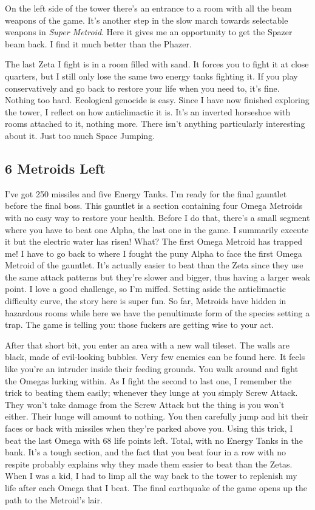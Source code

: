 \documentclass{book}
\begin{document}
On the left side of the tower there’s an entrance to a room with all the beam weapons of the game. It’s another step in the slow march towards selectable weapons in \emph{Super Metroid}. Here it gives me an opportunity to get the Spazer beam back. I find it much better than the Phazer.

The last Zeta I fight is in a room filled with sand. It forces you to fight it at close quarters, but I still only lose the same two energy tanks fighting it. If you play conservatively and go back to restore your life when you need to, it’s fine. Nothing too hard. Ecological genocide is easy. Since I have now finished exploring the tower, I reflect on how anticlimactic it is. It’s an inverted horseshoe with rooms attached to it, nothing more. There isn’t anything particularly interesting about it. Just too much Space Jumping.

\subsection*{6 Metroids Left}\nopagebreak[4]

I’ve got 250 missiles and five Energy Tanks. I’m ready for the final gauntlet before the final boss. This gauntlet is a section containing four Omega Metroids with no easy way to restore your health. Before I do that, there’s a small segment where you have to beat one Alpha, the last one in the game. I summarily execute it but the electric water has risen! What? The first Omega Metroid has trapped me! I have to go back to where I fought the puny Alpha to face the first Omega Metroid of the gauntlet. It’s actually easier to beat than the Zeta since they use the same attack patterns but they’re slower and bigger, thus having a larger weak point. I love a good challenge, so I’m miffed. Setting aside the anticlimactic difficulty curve, the story here is super fun. So far, Metroids have hidden in hazardous rooms while here we have the penultimate form of the species setting a trap. The game is telling you: those fuckers are getting wise to your act.

After that short bit, you enter an area with a new wall tileset. The walls are black, made of evil-looking bubbles. Very few enemies can be found here. It feels like you’re an intruder inside their feeding grounds. You walk around and fight the Omegas lurking within. As I fight the second to last one, I remember the trick to beating them easily; whenever they lunge at you simply Screw Attack. They won’t take damage from the Screw Attack but the thing is you won’t either. Their lunge will amount to nothing. You then carefully jump and hit their faces or back with missiles when they’re parked above you. Using this trick, I beat the last Omega with 68 life points left. Total, with no Energy Tanks in the bank. It’s a tough section, and the fact that you beat four in a row with no respite probably explains why they made them easier to beat than the Zetas. When I was a kid, I had to limp all the way back to the tower to replenish my life after each Omega that I beat. The final earthquake of the game opens up the path to the Metroid’s lair.
\end{document}
